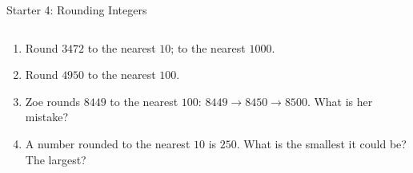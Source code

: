\documentclass{beamer}
\newcommand{\ashow}[1]{\uncover<2->{\textcolor{red}{\small #1}}}
\begin{document}
\begin{frame}{Starter 4: Rounding Integers}
\begin{columns}[T]
\begin{multicols}{2}
\begin{enumerate}
  \item Round $3472$ to the nearest $10$; to the nearest $1000$. \ashow{$3470$ and $3000$}

  \columnbreak

  \item Round $4950$ to the nearest $100$. \ashow{$5000$}

  \item Zoe rounds $8449$ to the nearest $100$: $8449\to 8450\to 8500$. What is her mistake? \ashow{Rounded twice: only the tens digit $4$ counts, so $8400$}

  \item A number rounded to the nearest $10$ is $250$. What is the smallest it could be? The largest? \ashow{$245$ and $254$}

\end{enumerate}
\end{multicols}

\end{columns}

\end{frame}
\end{document}
